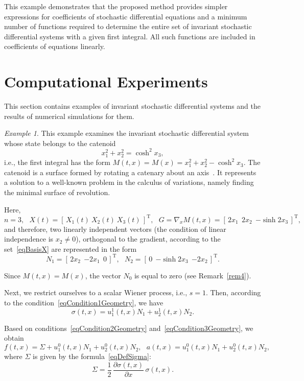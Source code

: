 \documentclass[10pt,reqno]{amsart}
\newcommand{\trans}{{\scriptscriptstyle \mathrm{T}}}
\theoremstyle{plain}
\theoremstyle{remark}
\newtheorem{Example}{Example}
\begin{document}
This example demonstrates that the proposed method provides simpler expressions for coefficients of stochastic differential equations and a minimum number of functions required to determine the entire set of invariant stochastic differential systems with a given first integral. All such functions are included in coefficients of equations linearly.



\section{Computational Experiments}\label{secNumerical}

This section contains examples of invariant stochastic differential systems and the results of numerical simulations for them.

\begin{Example}\label{ex1}
This example examines the invariant stochastic differential system whose state belongs to the catenoid
\[
  x_1^2 + x_2^2 = \cosh^2 x_3,
\]
i.e., the first integral has the form $M(t,x) = M(x) = x_1^2 + x_2^2 - \cosh^2 x_3$. The catenoid is a surface formed by rotating a catenary about an axis~\cite{KriIva_15}. It represents a solution to a well-known problem in the calculus of variations, namely finding the minimal surface of revolution.

Here,
\[
  n = 3, \ \ \ X(t) = [ \, X_1(t) ~ X_2(t) ~ X_3(t) \, ]^\trans, \ \ \ G = \nabla_x M(t,x) = [ \, 2x_1 \ \ 2x_2 \ \ {-\sinh 2x_3} \, ]^\trans,
\]
and therefore, two linearly independent vectors (the condition of linear independence is $x_2 \neq 0$), orthogonal to the gradient, according to the set~\eqref{eqBasisX} are represented in the form
\[
  N_1 = [ \, 2x_2 \ \ {-2x_1} \ \ 0 \, ]^\trans, \ \ \ N_2 = [ \, 0 \ \ {-\sinh 2x_3} \ \ {-2x_2} \, ]^\trans.
\]

Since $M(t,x) = M(x)$, the vector $N_0$ is equal to zero (see Remark~\ref{rem4}).

Next, we restrict ourselves to a scalar Wiener process, i.e., $s = 1$. Then, according to the condition~\eqref{eqCondition1Geometry}, we have
\[
  \sigma(t,x) = u_1^1(t,x) N_1 + u_2^1(t,x) N_2.
\]

Based on conditions~\eqref{eqCondition2Geometry} and~\eqref{eqCondition3Geometry}, we obtain
\[
  f(t,x) = \Sigma + u_1^0(t,x) N_1 + u_2^0(t,x) N_2, \ \ \ a(t,x) = u_1^0(t,x) N_1 + u_2^0(t,x) N_2,
\]
where $\Sigma$ is given by the formula~\eqref{eqDefSigma}:
\[
  \Sigma = \frac{1}{2} \, \frac{\partial \sigma(t,x)}{\partial x} \, \sigma(t,x).
\]


\end{Example}
\end{document}
